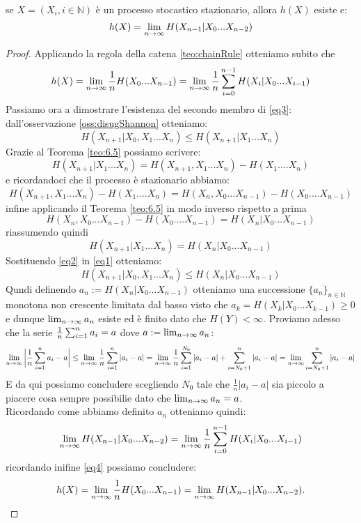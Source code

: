 \begin{teo}\label{teo:10.10}
se $X=(X_i,i\in \mathbb{N})$ è un processo stocastico stazionario, allora $h(X)$ esiste e:
\begin{equation} \label{eq3}
h(X)=\lim_{n\to \infty} H(X_{n-1}|X_0...X_{n-2})
\end{equation}
\end{teo}
\begin{proof}
Applicando la regola della catena \ref{teo:chainRule} otteniamo subito che
\begin{equation}\label{eq4}
h(X)=\lim_{n\to \infty} \frac{1}{n} H(X_0...X_{n-1})= \lim_{n\to \infty} \frac{1}{n} \sum_{i=0}^{n-1}H(X_i|X_0...X_{i-1})
\end{equation}
Passiamo ora a dimostrare l'esistenza del secondo membro di \ref{eq3}:\\
dall'osservazione \ref{oss:disugShannon} otteniamo:
\begin{equation} \label{eq1}
H(X_{n+1}|X_0,X_1...X_n) \leq H(X_{n+1}|X_1...X_n)
\end{equation}
Grazie al Teorema \ref{teo:6.5} possiamo scrivere:
$$H(X_{n+1}|X_1...X_n)=H(X_{n+1},X_1...X_n) - H(X_1....X_n)$$
e ricordandoci che il processo è stazionario abbiamo:
$$H(X_{n+1},X_1...X_n) - H(X_1....X_n)= H(X_{n},X_0...X_{n-1}) - H(X_0....X_{n-1})$$
infine applicando il Teorema \ref{teo:6.5} in modo inverso rispetto a prima
$$H(X_{n},X_0...X_{n-1}) - H(X_0....X_{n-1})=H(X_{n}|X_0...X_{n-1})$$
riassumendo quindi
\begin{equation} \label{eq2}
H(X_{n+1}|X_1...X_n)=H(X_{n}|X_0...X_{n-1})
\end{equation}
Sostituendo \ref{eq2} in \ref{eq1} otteniamo:
\begin{equation}
H(X_{n+1}|X_0,X_1...X_n) \leq H(X_{n}|X_0...X_{n-1})
\end{equation}
Qundi definendo $a_n :=  H(X_{n}|X_0...X_{n-1})$ otteniamo una successione $\{ a_n \}_{n\in \mathbb{N}}$ monotona non crescente limitata dal basso visto che $a_k=H(X_{k}|X_0...X_{k-1})\geq 0$ e dunque $\lim_{n\to \infty} a_n$ esiste ed è finito dato che $H(Y)<\infty$.
Proviamo adesso che la serie $\frac{1}{n} \sum_{i=1}^n a_i = a$ dove $a:=\lim_{n\to \infty} a_n$:
$$\lim_{n\to \infty} \bigg| \frac{1}{n} \sum_{i=1}^n a_i-a \bigg| \leq \lim_{n\to \infty} \frac{1}{n} \sum_{i=1}^n |a_i-a| = \lim_{n\to \infty} \frac{1}{n} \sum_{i=1}^{N_0} |a_i-a| + \sum_{i=N_0+1}^{n} |a_i-a|= \lim_{n\to \infty} \sum_{i=N_0+1}^{n} |a_i-a|$$
E da qui possiamo concludere scegliendo $N_0$ tale che $\frac{1}{n}|a_i-a|$ sia piccolo a piacere cosa sempre possibilie dato che $\lim_{n\to \infty} a_n=a$.\\
Ricordando come abbiamo definito $a_n$ otteniamo quindi:
\begin{equation}
\lim_{n\to \infty} H(X_{n-1}|X_0...X_{n-2})=\lim_{n\to \infty} \frac{1}{n} \sum_{i=0}^{n-1}H(X_i|X_0...X_{i-1})
\end{equation}
ricordando inifine \ref{eq4} possiamo concludere:
$$h(X)=\lim_{n\to \infty} \frac{1}{n} H(X_0...X_{n-1}) = \lim_{n\to \infty} H(X_{n-1}|X_0...X_{n-2}).$$
\end{proof}
